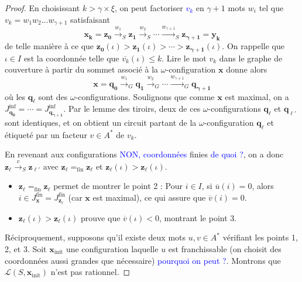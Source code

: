 \documentclass[a4paper,final]{article}
\theoremstyle{definition}
\let\leq\leqslant
\newcommand{\alain}[1]{\textcolor{blue}{#1}}
\newcommand{\eqfin}{\ensuremath{=_\text{fin}}}
\newcommand{\lang}{\ensuremath{\mathcal{L}}}
\newcommand{\trans}[2]{\ensuremath{\stackrel{#1}{\longrightarrow}_{#2}}}
\newcommand{\vect}[1]{\ensuremath{\mathbf{#1}}}
\newcommand{\xinit}{\ensuremath{\vect{x}_\text{init}}}
\newcommand{\valeur}[1]{\ensuremath{\overline{#1}}}
\newcommand{\Jfin}[1]{J^\text{fin}_{#1}}
\newcommand{\Jinf}[1]{J^\text{inf}_{#1}}
\begin{document}
\begin{proof}
En choisissant $k > \gamma \times \xi$, on peut factoriser \alain{$v_k$ }en $\gamma + 1$ mots $w_i$ tel que $v_k = w_1 w_2 \dots w_{\gamma + 1}$ satisfaisant
$$\vect{x_k} = \vect{z_0} \trans{w_1}{S} \vect{z_1} \trans{w_2}{S} \cdots \trans{w_{\gamma + 1}}{S} \vect{z_{\gamma + 1}} = \vect{y_k}$$
de telle manière à ce que $\vect{z_0}(\iota) > \vect{z_1}(\iota) > \cdots > \vect{z_{\gamma + 1}}(\iota)$.
On rappelle que $\iota \in I$ est la coordonnée telle que $\valeur{v_k}(\iota) \leq k$.
Lire le mot $v_k$ dans le graphe de couverture à partir du sommet associé à la $\omega$-configuration $\vect{x}$ donne alors 
$$\vect{x} = \vect{q_0} \trans{w_1}{G} \vect{q_1} \trans{w_2}{G} \cdots \trans{w_{\gamma + 1}}{G} \vect{q_{\gamma + 1}}$$
où les $\vect{q_\ell}$ sont des $\omega$-configurations.
Soulignons que comme $\vect{x}$  est maximal, on a $\Jinf{\vect{q_0}} = \cdots = \Jinf{\vect{q_{\gamma+1}}}$.
Par le lemme des tiroirs, deux de ces $\omega$-configurations $\vect{q_\ell}$ et $\vect{q_{\ell'}}$ sont identiques, et on obtient un circuit partant de la $\omega$-configuration $\vect{q_\ell}$ et étiqueté par un facteur $v\in A^*$ de $v_k$.

En revenant aux configurations \alain{NON, coordonnées} finies \alain{de quoi ?}, on a donc $\vect{z_\ell} \trans{v}{S} \vect{z_{\ell'}}$ avec $\vect{z_\ell} \eqfin \vect{z_\ell}$ et $\vect{z_\ell}(\iota) > \vect{z_\ell}(\iota)$.

\begin{itemize}
    \item $\vect{z_\ell} \eqfin \vect{z_\ell}$ permet de montrer le point 2 :
    Pour $i\in I$, si $\valeur{u}(i) = 0$, alors $i\in\Jfin{\vect{x}} = \Jfin{\vect{z_\ell}}$ (car $\vect{x}$ est maximal), ce qui assure que $\valeur{v}(i) = 0$.
    
    \item $\vect{z_\ell}(\iota) > \vect{z_\ell}(\iota)$ prouve que $\valeur{v}(\iota) < 0$, montrant le point 3.
\end{itemize}


\vspace{5mm}

Réciproquement, supposons qu'il existe deux mots $u,v\in A^*$ vérifiant les points 1, 2, et 3.
Soit $\xinit$ une configuration  laquelle $u$ est franchissable (on choisit des coordonnées aussi grandes que nécessaire) \alain{pourquoi on peut ?}.
Montrons que $\lang(S,\xinit)$ n'est pas rationnel.


\end{proof}
\end{document}
